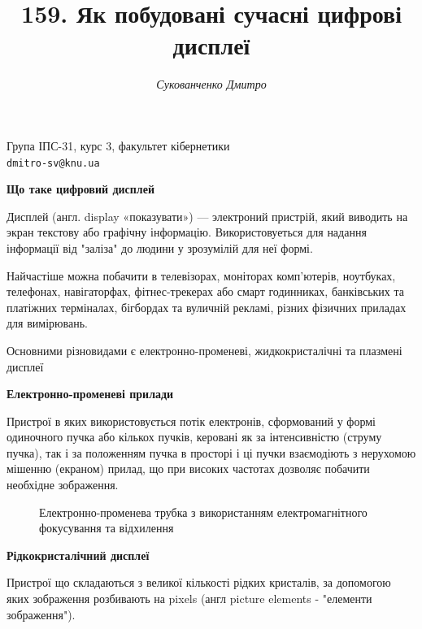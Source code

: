 \documentclass[a4paper]{article}
\begin{document}
\title{159. Як побудовані сучасні цифрові дисплеї}
\author{\textsl{Сукованченко Дмитро}}
\date{\vspace*{-6ex}}
\maketitle
\begin{center} 
{\small Група ІПС-31, курс 3, факультет кібернетики\\
{\tt dmitro-sv@knu.ua}}
\end{center}


\textbf{Що таке цифровий дисплей}

Дисплей (англ. display «показувати») — электроний пристрій, який виводить на экран текстову або графічну інформацію. Використовуеться для надання інформації від "заліза" до людини у зрозумілій для неї формі.

Найчастіше можна побачити в телевізорах, моніторах комп'ютерів, ноутбуках, телефонах, навігаторфах, фітнес-трекерах або смарт годинниках, банківських та платіжних терміналах, бігбордах та вуличній рекламі, різних фізичних приладах для вимірювань.

Основними різновидами є електронно-променеві, жидкокристалічні та плазмені дисплеї

\textbf{Електронно-променеві прилади}

Пристрої в яких використовується потік електронів, сформований у формі одиночного пучка або кількох пучків, керовані як за інтенсивністю (струму пучка), так і за положенням пучка в просторі і ці пучки взаємодіють з нерухомою мішенню (екраном) прилад, що при високих частотах дозволяє побачити необхідне зображення.

\begin{figure}[ht]
\caption{Електронно-променева трубка з використанням електромагнітного фокусування та відхилення}
\end{figure}


\textbf{Рідкокристалічний дисплеї}

Пристрої що складаються з великої кількості рідких кристалів, за допомогою яких зображення розбивають на pixels (англ picture elements - "елементи зображення").
\end{document}
